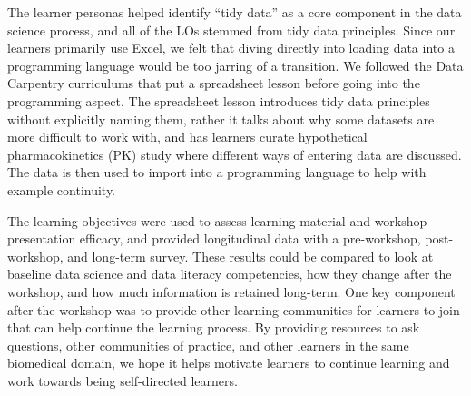 \documentclass[030-workshop.tex]{subfiles}
\begin{document}
    The learner personas helped identify ``tidy data'' as a core component in the data science process,
    and all of the LOs stemmed from tidy data principles.
    Since our learners primarily use Excel,
    we felt that diving directly into loading data into a programming language would be too jarring of a transition.
    We followed the Data Carpentry curriculums that put a spreadsheet lesson before going into the programming aspect.
    The spreadsheet lesson introduces tidy data principles without explicitly naming them,
    rather it talks about why some datasets are more difficult to work with,
    and has learners curate hypothetical pharmacokinetics (PK) study where different ways of entering data are discussed.
    The data is then used to import into a programming language to help with example continuity.

    The learning objectives were used to assess learning material and workshop presentation efficacy,
    and provided longitudinal data with a pre-workshop, post-workshop, and long-term survey.
    These results could be compared to look at baseline data science and data literacy competencies,
    how they change after the workshop,
    and how much information is retained long-term.
    One key component after the workshop was to provide other learning communities for learners to join
    that can help continue the learning process.
    By providing resources to ask questions, other communities of practice,
    and other learners in the same biomedical domain,
    we hope it helps motivate learners to continue learning and work towards being self-directed learners.
\end{document}
